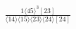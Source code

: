 \documentclass[varwidth, border=5pt]{standalone}
\begin{document}
\begin{my}
$\begin{gathered}
\scriptscriptstyle\frac{1⟨45⟩^3[23]}{⟨14⟩⟨15⟩⟨23⟩⟨24⟩[24]}
\end{gathered}$
\end{my}
\end{document}
